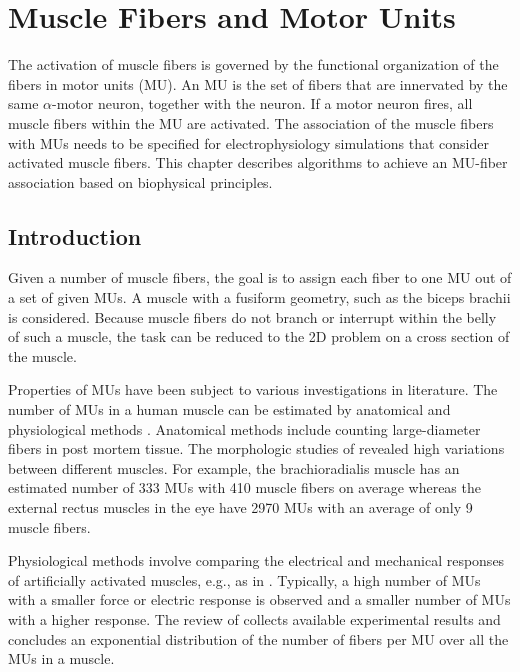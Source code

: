 
\chapter{Muscle Fibers and Motor Units}\label{sec:muscle_fibers_and_motor_units}
The activation of muscle fibers is governed by the functional organization of the fibers in motor units (MU). An MU is the set of fibers that are innervated by the same $\alpha$-motor neuron, together with the neuron. If a motor neuron fires, all muscle fibers within the MU are activated. The association of the muscle fibers with MUs needs to be specified for electrophysiology simulations that consider activated muscle fibers. This chapter describes algorithms to achieve an MU-fiber association based on biophysical principles.

\section{Introduction}\label{sec:mu_intro}
Given a number of muscle fibers, the goal is to assign each fiber to one MU out of a set of given MUs. A muscle with a fusiform geometry, such as the biceps brachii is considered. Because muscle fibers do not branch or interrupt within the belly of such a muscle, the task can be reduced to the 2D problem on a cross section of the muscle.

Properties of MUs have been subject to various investigations in literature. The number of MUs in a human muscle can be estimated by anatomical and physiological methods \cite{MacIntosh2006}. Anatomical methods include counting large-diameter fibers in post mortem tissue. The morphologic studies of \cite{Feinstein1955} revealed high variations between different muscles. For example, the brachioradialis muscle has an estimated number of \num{333} MUs with \num{410} muscle fibers on average whereas the external rectus muscles in the eye have \num{2970} MUs with an average of only 9 muscle fibers. 

Physiological methods involve comparing the electrical and mechanical responses of artificially activated muscles, e.g., as in \cite{Milner-Brown1973b,Thomas1990b}. Typically, a high number of MUs with a smaller force or electric response is observed and a smaller number of MUs with a higher response. 
The review of \cite{Enoka2001} collects available experimental results and concludes an exponential distribution of the number of fibers per MU over all the MUs in a muscle.

